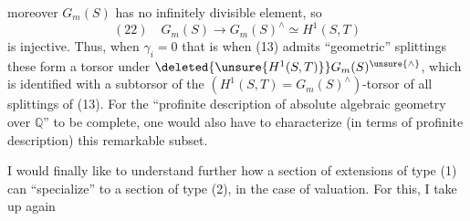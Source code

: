 moreover $G_m(S)$ has no infinitely divisible element, so
\[
(22)\quad G_m(S)\longrightarrow G_m(S)^\wedge\simeq H^1(S,T)
\]
is injective. Thus, when $\gamma_i=0$ that is when (13) admits ``geometric'' splittings  these form a torsor under $\deleted{\unsure{H^1(S,T)}}G_m(S)^{\unsure{\wedge}}$, which is identified with a subtorsor of the $(H^1(S,T)=G_m(S)^\wedge)$-torsor of all splittings of (13). For the ``profinite description of absolute algebraic geometry over $\mathbb Q$'' to be complete, one would also have to characterize (in terms of  profinite description) this remarkable subset.

I would finally like to understand further how a section of extensions of type (1) can ``specialize'' to a section of type (2), in the case of  valuation. For this, I take up again
